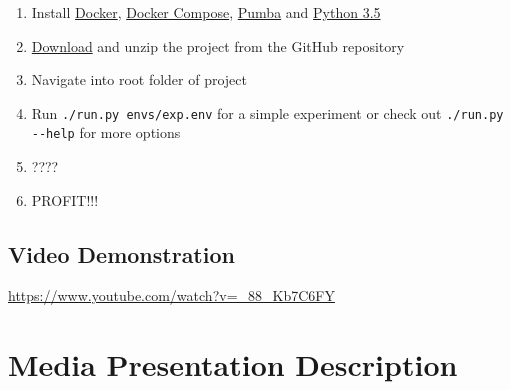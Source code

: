 \begin{enumerate}
    \item Install \href{https://docs.docker.com/install/}{Docker}, \href{https://docs.docker.com/compose/install/}{Docker Compose}, \href{https://github.com/alexei-led/pumba/releases}{Pumba} and \href{https://www.python.org/downloads/}{Python 3.5}
    \item \href{https://github.com/andreasmalling/flixtube/archive/master.zip}{Download} and unzip the project from the GitHub repository
    \item Navigate into root folder of project
    \item Run \lstinline[columns=fixed]{./run.py envs/exp.env} for a simple experiment or check out \lstinline[columns=fixed]{./run.py --help} for more options
    \item ????
    \item PROFIT!!!
\end{enumerate}

\section{Video Demonstration}

\url{https://www.youtube.com/watch?v=_88_Kb7C6FY}

\chapter{Media Presentation Description}
\label{app:mpd}


